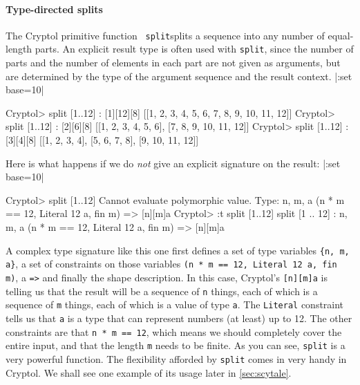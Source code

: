 \paragraph*{Type-directed splits} The Cryptol primitive function {\tt
  split}\indSplit splits a sequence into any number of equal-length
parts. An explicit result type is often used with {\tt split}, since
the number of parts and the number of elements in each part are not
given as arguments, but are determined by the type of the argument
sequence and the result context.
\restartrepl
\hidereplin|:set base=10|
\begin{replPrompt}
  Cryptol> split [1..12] : [1][12][8]
  [[1, 2, 3, 4, 5, 6, 7, 8, 9, 10, 11, 12]]
  Cryptol> split [1..12] : [2][6][8]
  [[1, 2, 3, 4, 5, 6], [7, 8, 9, 10, 11, 12]]
  Cryptol> split [1..12] : [3][4][8]
  [[1, 2, 3, 4], [5, 6, 7, 8], [9, 10, 11, 12]]
\end{replPrompt}
Here is what happens if we do {\em not} give an explicit signature on
the result:\indSignature
\restartrepl
\hidereplin|:set base=10|
\begin{replPrompt}
  Cryptol> split [1..12]
  Cannot evaluate polymorphic value.
  Type: {n, m, a} (n * m == 12, Literal 12 a, fin m) => [n][m]a
  Cryptol> :t split [1..12]
  split [1 .. 12] : {n, m, a} (n * m == 12, Literal 12 a, fin m) => [n][m]a
\end{replPrompt}

A complex type signature like this one first defines a set of type
variables \verb|{n, m, a}|, a set of constraints on those variables
\verb|(n * m == 12, Literal 12 a, fin m)|, a \texttt{=>} and finally
the shape description. In this case, Cryptol's \texttt{[n][m]a} is
telling us that the result will be a sequence of \texttt{n} things,
each of which is a sequence of \texttt{m} things, each of which is a
value of type \texttt{a}. The \texttt{Literal} constraint tells us
that \texttt{a} is a type that can represent numbers (at least) up to
12. The other constraints are that \texttt{n * m == 12}, which means
we should completely cover the entire input, and that the length
\texttt{m} needs to be finite. As you can see, \texttt{split} is a
very powerful function. The flexibility afforded by \texttt{split}
comes in very handy in Cryptol. We shall see one example of its usage
later in \autoref{sec:scytale}.

